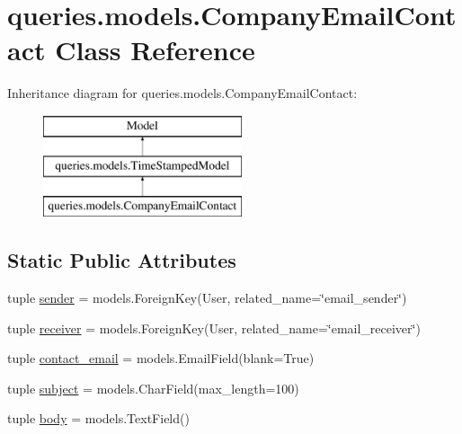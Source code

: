 \hypertarget{classqueries_1_1models_1_1_company_email_contact}{\section{queries.\-models.\-Company\-Email\-Contact Class Reference}
\label{classqueries_1_1models_1_1_company_email_contact}
}
Inheritance diagram for queries.\-models.\-Company\-Email\-Contact\-:\begin{figure}[H]
\begin{center}
\leavevmode
\includegraphics[height=3.000000cm]{classqueries_1_1models_1_1_company_email_contact}
\end{center}
\end{figure}
\subsection*{Static Public Attributes}
\begin{DoxyCompactItemize}
\item 
tuple \hyperlink{classqueries_1_1models_1_1_company_email_contact_a0a818b791cc30ac3c64ebbc3fd43e32b}{sender} = models.\-Foreign\-Key(User, related\-\_\-name=\char`\"{}email\-\_\-sender\char`\"{})
\item 
tuple \hyperlink{classqueries_1_1models_1_1_company_email_contact_a0b1727e6533da70429aca93a52511d8e}{receiver} = models.\-Foreign\-Key(User, related\-\_\-name=\char`\"{}email\-\_\-receiver\char`\"{})
\item 
tuple \hyperlink{classqueries_1_1models_1_1_company_email_contact_a96aeebf246ff40a5290fa98ffd70875e}{contact\-\_\-email} = models.\-Email\-Field(blank=True)
\item 
tuple \hyperlink{classqueries_1_1models_1_1_company_email_contact_ad46e14645bd327c60c41ffc0f3414df2}{subject} = models.\-Char\-Field(max\-\_\-length=100)
\item 
tuple \hyperlink{classqueries_1_1models_1_1_company_email_contact_a18e8a88d9cff26bf7ae63a00dfad7d0f}{body} = models.\-Text\-Field()
\end{DoxyCompactItemize}


